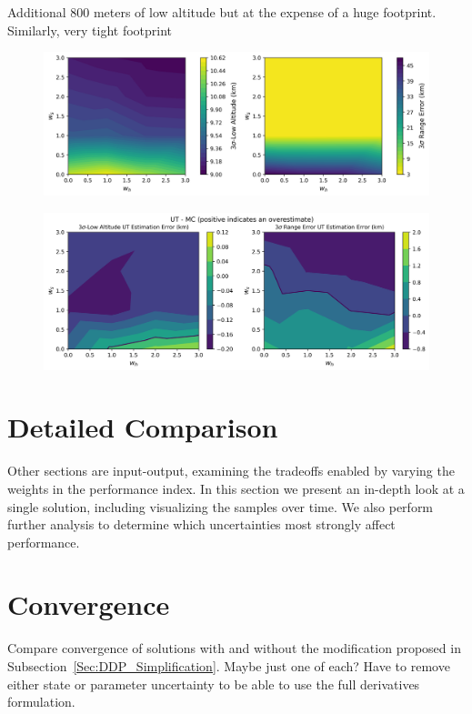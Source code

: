 Additional 800 meters of low altitude but at the expense of a huge footprint. Similarly, very tight footprint 
\begin{figure}[h!]
	\centering
	\includegraphics[width=1\textwidth]{Images/Reoptimized_WeightSweepMCResults}
	\caption{}
	\label{Fig:MCResultsOptGain}
\end{figure}
\begin{figure}[h!]
	\centering
	\includegraphics[width=1\textwidth]{Images/Reoptimized_WeightSweepError}
	\caption{}
	\label{Fig:MCErrorsOptGain}
\end{figure}

\section{Detailed Comparison}
Other sections are input-output, examining the tradeoffs enabled by varying the weights in the performance index. In this section we present an in-depth look at a single solution, including visualizing the samples over time. We also perform further analysis to determine which uncertainties most strongly affect performance. 

\section{Convergence}
Compare convergence of solutions with and without the modification proposed in Subsection~\ref{Sec:DDP_Simplification}. Maybe just one of each? Have to remove either state or parameter uncertainty to be able to use the full derivatives formulation.

